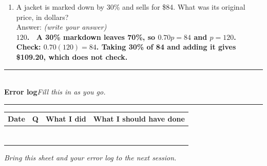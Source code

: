 \documentclass[11pt,a4paper]{article}
\newif\ifANSWERS
\newcommand{\PartHead}[2]{%
  \vspace{6pt}
  {\color{navy}\rule{\textwidth}{0.8pt}}\\[2pt]
  {\large\bfseries\color{navy}#1}\hfill{\small\itshape #2}\\[-4pt]
  {\color{navy}\rule{\textwidth}{0.4pt}}
  \vspace{4pt}
}
\newcommand{\spr}{\\[3pt]\hspace*{6pt}Answer: \underline{\hspace{3.2cm}}\hfill{\footnotesize\itshape(write your answer)}}
\newcommand{\ans}[1]{\ {\color{keyred}\bfseries #1}}
\newcommand{\ans}[1]{}
\begin{document}
\begin{enumerate}[leftmargin=20pt,itemsep=9pt]
\item A jacket is marked down by 30\% and sells for \$84. What was its original price,
  in dollars? \spr
  \ans{\\ $120$. \ A 30\% markdown leaves 70\%, so $0.70p=84$ and $p=120$. Check:
  $0.70(120)=84$. Taking 30\% of 84 and adding it gives \$109.20, which does not check.}
\end{enumerate}

\ifANSWERS\else
\vspace{10pt}
\PartHead{Error log}{Fill this in as you go.}
\begin{center}
\begin{tabularx}{\textwidth}{|c|c|X|X|}
\hline
\textbf{Date} & \textbf{Q} & \textbf{What I did} & \textbf{What I should have done}\\
\hline
\rule{0pt}{22pt} & & &\\ \hline
\rule{0pt}{22pt} & & &\\ \hline
\rule{0pt}{22pt} & & &\\ \hline
\rule{0pt}{22pt} & & &\\ \hline
\rule{0pt}{22pt} & & &\\ \hline
\rule{0pt}{22pt} & & &\\ \hline
\rule{0pt}{22pt} & & &\\ \hline
\end{tabularx}
\end{center}
\vspace{4pt}
\begin{center}\small\itshape
Bring this sheet and your error log to the next session.
\end{center}
\fi

\ifANSWERS
\newpage
\PartHead{Five-minute marking routine}{Tutor}
\begin{enumerate}[leftmargin=20pt,itemsep=4pt]
\item \textbf{Score Part A only.} Below 8/10 means an earlier week has decayed, and the
  next warm-up repairs that week before anything new is introduced.
\item \textbf{In Part B check two things: whether he named the unknown, and whether the
  equation reads back as the story.} A right equation reached without naming the unknown
  is still a miss this week. Read his equation aloud as a sentence and ask him whether
  that is what the question said.
\item \textbf{Pick two wrong answers from Part E} and have him narrate his thinking out
  loud. Leave the rest unmarked.
\end{enumerate}
If the error log is filled in, say so out loud. He will do more of what you visibly value.
\fi
\end{document}
